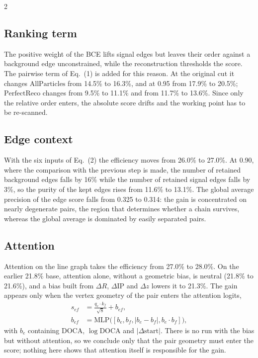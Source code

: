 \documentclass[10pt]{article}
\newcommand{\All}{\ensuremath{\mathrm{AllParticles}}}
\newcommand{\Perf}{\ensuremath{\mathrm{PerfectReco}}}
\begin{document}
\begin{multicols}{2}
\subsection{Ranking term}

The positive weight of the BCE lifts signal edges but leaves their order against a background edge unconstrained, while the reconstruction thresholds the score. The pairwise term of Eq.~(1) is added for this reason. At the original cut it changes \All{} from 14.5\% to 16.3\%, and at 0.95 from 17.9\% to 20.5\%; \Perf{} changes from 9.5\% to 11.1\% and from 11.7\% to 13.6\%. Since only the relative order enters, the absolute score drifts and the working point has to be re-scanned.

\subsection{Edge context}

With the six inputs of Eq.~(2) the efficiency moves from 26.0\% to 27.0\%. At 0.90, where the comparison with the previous step is made, the number of retained background edges falls by 16\% while the number of retained signal edges falls by 3\%, so the purity of the kept edges rises from 11.6\% to 13.1\%. The global average precision of the edge score falls from 0.325 to 0.314: the gain is concentrated on nearly degenerate pairs, the region that determines whether a chain survives, whereas the global average is dominated by easily separated pairs.

\subsection{Attention}

Attention on the line graph takes the efficiency from 27.0\% to 28.0\%. On the earlier 21.8\% base, attention alone, without a geometric bias, is neutral (21.8\% to 21.6\%), and a bias built from $\Delta R$, $\Delta$IP and $\Delta z$ lowers it to 21.3\%. The gain appears only when the vertex geometry of the pair enters the attention logits,
\begin{equation}
\begin{aligned}
s_{ef}&=\frac{q_e\cdot k_f}{\sqrt{8}}+b_{ef},\\
b_{ef}&=\mathrm{MLP}\big([b_e,b_f,|b_e-b_f|,b_e\cdot b_f]\big),
\end{aligned}
\end{equation}
with $b_e$ containing DOCA, $\log$DOCA and $|\Delta\mathrm{start}|$. There is no run with the bias but without attention, so we conclude only that the pair geometry must enter the score; nothing here shows that attention itself is responsible for the gain.


\end{multicols}
\end{document}

